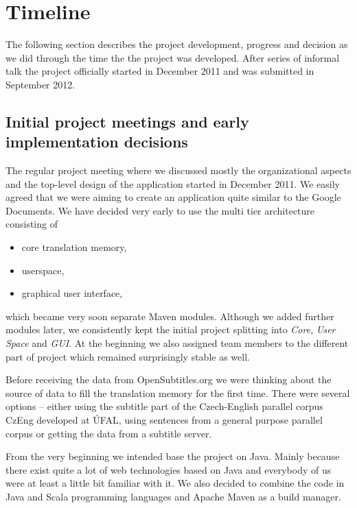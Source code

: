 \section{Timeline}

The following section describes the project development, progress and decision as we did through the time the the project was developed. After series of informal talk the project officially started in December 2011 and was submitted in September 2012.

\subsection{Initial project meetings and early implementation decisions}

The regular project meeting where we discussed mostly the organizational aspects and the top-level design of the application started in December 2011. We easily agreed that we were aiming to create an application quite similar to the Google Documents. We have decided very early to use the multi tier architecture consisting of

\begin{itemize}
\item core translation memory,
\item userspace,
\item graphical user interface,
\end{itemize}

which became very soon separate Maven modules. Although we added further modules later, we consistently kept the initial project splitting into \emph{Core}, \emph{User Space} and \emph{GUI}. At the beginning we also assigned team members to the different part of project which remained surprisingly stable as well. 

Before receiving the data from OpenSubtitles.org we were thinking about the source of data to fill the translation memory for the first time. There were several options -- either using the subtitle part of the Czech-English parallel corpus CzEng developed at ÚFAL, using sentences from a general purpose parallel corpus or getting the data from a subtitle server.

From the very beginning we intended base the project on Java. Mainly because there exist quite a lot of web technologies based on Java and everybody of us were at least a little bit familiar with it. We also decided to combine the code in Java and Scala programming languages and Apache Maven as a build manager.

